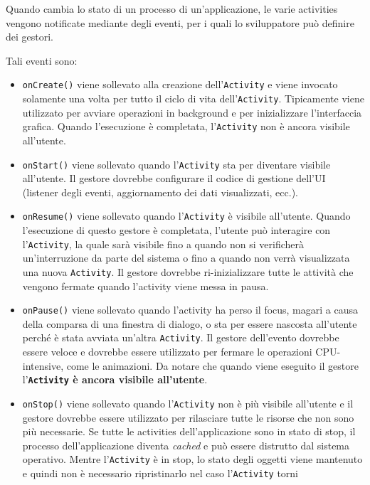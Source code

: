 Quando cambia lo stato di un processo di un'applicazione, le varie
activities vengono notificate mediante degli eventi, per i quali lo
sviluppatore può definire dei gestori.

Tali eventi sono:

\begin{itemize}
	\item \texttt{onCreate()} viene sollevato alla creazione dell'\texttt{Activity} e
		viene invocato solamente una volta per tutto il ciclo di vita
		dell'\texttt{Activity}. Tipicamente viene utilizzato per avviare operazioni in
		background e per inizializzare l'interfaccia grafica. Quando
		l'esecuzione è completata, l'\texttt{Activity} non è ancora visibile
		all'utente.
	\item \texttt{onStart()} viene sollevato quando l'\texttt{Activity} sta per diventare
		visibile all'utente. Il gestore dovrebbe configurare il codice di
		gestione dell'UI (listener degli eventi, aggiornamento dei dati
		visualizzati, ecc.).
	\item \texttt{onResume()} viene sollevato quando l'\texttt{Activity} è visibile
		all'utente. Quando l'esecuzione di questo gestore è completata,
		l'utente può interagire con l'\texttt{Activity}, la quale sarà visibile fino a
		quando non si verificherà un'interruzione da parte del sistema o fino
		a quando non verrà visualizzata una nuova \texttt{Activity}. Il gestore
		dovrebbe ri-inizializzare tutte le attività che vengono fermate quando
		l'activity viene messa in pausa.
	\item \texttt{onPause()} viene sollevato quando l'activity ha perso il
		focus, magari a causa della comparsa di una finestra di dialogo, o sta
		per essere nascosta all'utente perché è stata avviata un'altra
		\texttt{Activity}. Il gestore dell'evento dovrebbe essere veloce e dovrebbe
		essere utilizzato per fermare le operazioni CPU-intensive, come le
		animazioni. Da notare che quando viene eseguito il gestore
		l'\textbf{\texttt{Activity} è ancora visibile all'utente}.
	\item \texttt{onStop()} viene sollevato quando l'\texttt{Activity} non è più visibile
		all'utente e il gestore dovrebbe essere utilizzato per rilasciare
		tutte le risorse che non sono più necessarie. Se tutte le activities
		dell'applicazione sono in stato di stop, il processo dell'applicazione
		diventa \emph{cached} e può essere distrutto dal sistema operativo.
		Mentre l'\texttt{Activity} è in stop, lo stato degli oggetti viene mantenuto e
		quindi non è necessario ripristinarlo nel caso l'\texttt{Activity} torni

\end{itemize}
